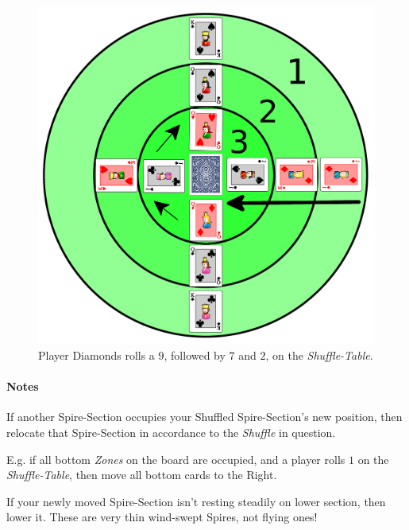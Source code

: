 \begin{figure}[h!]
	\centering
	\includegraphics[width=\linewidth]{img/shuffle.png}
	\caption{Player Diamonds rolls a $9$, followed by $7$ and $2$, on the \textit{Shuffle-Table}.}
	\label{fig:shuffle}
\end{figure}

\paragraph{Notes}
If another Spire-Section occupies your Shuffled Spire-Section's new position, then relocate that Spire-Section in accordance to the \textit{Shuffle} in question.

E.g. if all bottom \textit{Zones} on the board are occupied, and a player rolls $1$ on the \textit{Shuffle-Table}, then move all bottom cards to the Right.

If your newly moved Spire-Section isn't resting steadily on lower section, then lower it.
These are very thin wind-swept Spires, not flying ones!
